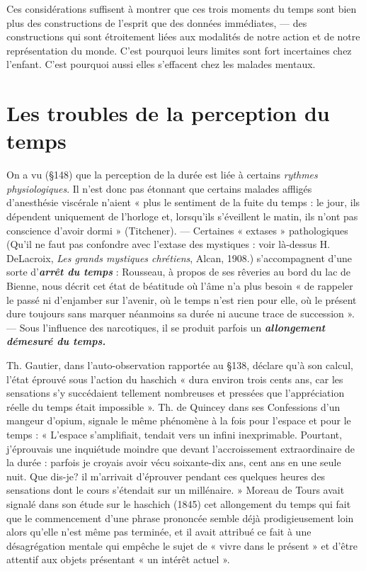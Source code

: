 Ces considérations suffisent à montrer que ces trois moments du
temps sont bien plus des constructions de l'esprit que des données
immédiates, — des constructions qui sont étroitement liées aux
modalités de notre action et de notre représentation du monde. C'est
pourquoi leurs limites sont fort incertaines chez l’enfant. C’est pourquoi
aussi elles s’effacent chez les malades mentaux.

\section{Les troubles de la perception du temps}%
On a vu
(\S 148) que la perception de la durée est liée à certains {\it rythmes physiologiques}.
Il n’est donc pas étonnant que certains malades affligés
d’anesthésie viscérale n’aient « plus le sentiment de la fuite du temps :
le jour, ils dépendent uniquement de l’horloge et, lorsqu'ils s’éveillent
le matin, ils n’ont pas conscience d’avoir dormi » (Titchener). —
Certaines « extases » pathologiques
({\scriptsize Qu'il ne faut pas confondre avec l'extase des mystiques : voir là-dessus H. DeLacroix,
{\it Les grands mystiques chrétiens}, Alcan, 1908.})
s’accompagnent d’une sorte d’\textbf{\textit {arrêt
du temps}} : Rousseau, à propos de ses rêveries au bord du lac de
Bienne, nous décrit cet état de béatitude où l’âme n’a plus besoin
« de rappeler le passé ni d’enjamber sur l’avenir, où le temps n’est
rien pour elle, où le présent dure toujours sans marquer néanmoins
sa durée ni aucune trace de succession ». — Sous l’influence des narcotiques,
il se produit parfois un \textbf{\textit {allongement démesuré du temps.}}

\vspace{0.24cm}
{\footnotesize Th. Gautier, dans l’auto-observation rapportée au \S 138, déclare qu'à
son calcul, l’état éprouvé sous l’action du haschich « dura environ trois
cents ans, car les sensations s’y succédaient tellement nombreuses et pressées
que l'appréciation réelle du temps était impossible ». Th. de Quincey
dans ses Confessions d'un mangeur d'opium, signale le même phénomène
à la fois pour l’espace et pour le temps : « L'espace s’amplifiait, tendait vers
un infini inexprimable. Pourtant, j'éprouvais une inquiétude moindre
que devant l'accroissement extraordinaire de la durée : parfois je croyais
avoir vécu soixante-dix ans, cent ans en une seule nuit. Que dis-je? il
m'arrivait d’éprouver pendant ces quelques heures des sensations dont le
cours s’étendait sur un millénaire. » Moreau de Tours avait signalé dans
son étude sur le haschich (1845) cet allongement du temps qui fait que le
commencement d’une phrase prononcée semble déjà prodigieusement loin
alors qu’elle n’est même pas terminée, et il avait attribué ce fait à une
désagrégation mentale qui empêche le sujet de « vivre dans le présent » et
d’être attentif aux objets présentant « un intérêt actuel ».}
\vspace{0.31cm}

